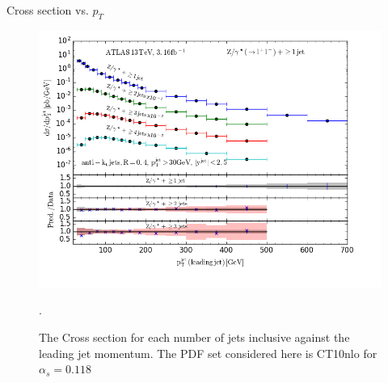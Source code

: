 \documentclass[14pt]{beamer}
\begin{document}


\begin{frame}[fragile]{Cross section vs. ${p_T}$}
	\begin{figure} 
		\begin{center}
			\includegraphics[width=0.7 \textwidth]{xsection_118CT10.png}
			\caption{The Cross section for each number of jets inclusive against the leading jet momentum. The PDF set considered here is CT10nlo for ${\alpha_s = 0.118}$}. %
			\label{CHI}
		\end{center}
	\end{figure}
	
\end{frame}
\end{document}
